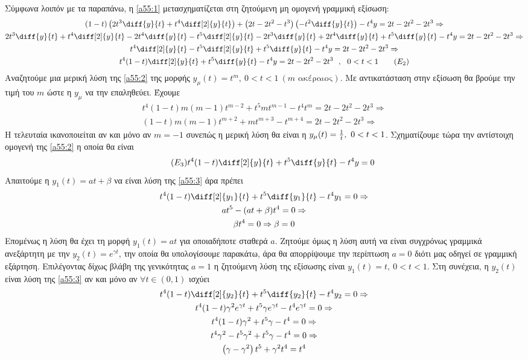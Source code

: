\documentclass[a4paper,twoside,11pt]{book}
\DeclareRobustCommand{\frac}[3][0pt]{%
{\begingroup\hspace{#1}#2\hspace{#1}\endgroup\over\hspace{#1}#3\hspace{#1}}}
\begin{document}
Σύμφωνα λοιπόν με τα παραπάνω, η \eqref{a55:1} μετασχηματίζεται στη ζητούμενη μη ομογενή γραμμική εξίσωση:
\begin{gather}
(1-t)\left( 2t^3\diff{y}{t}+t^4\diff[2]{y}{t}\right)+\left(2t-2t^2-t^3\right)\left( -t^2\diff{y}{t}\right) -t^4y=2t-2t^2-2t^3\Rightarrow\nonumber\\
2t^3\diff{y}{t}+t^4\diff[2]{y}{t}-2t^4\diff{y}{t}-t^5\diff[2]{y}{t}-2t^3\diff{y}{t}+2t^4\diff{y}{t}+t^5\diff{y}{t}-t^4y=2t-2t^2-2t^3\Rightarrow\nonumber\\
t^4\diff[2]{y}{t}-t^5\diff[2]{y}{t}+t^5\diff{y}{t}-t^4y=2t-2t^2-2t^3\Rightarrow\\
t^4(1-t)\diff[2]{y}{t}+t^5\diff{y}{t}-t^4y=2t-2t^2-2t^3\ \ ,\ \ 0<t<1\label{a55:2}\tag{$ E_2 $}
\end{gather}
Αναζητούμε μια μερική λύση της \eqref{a55:2} της μορφής $ y_\mu(t)=t^m,\ 0<t<1\ (m \textrm{ ακέραιος}) $. Με αντικατάσταση στην εξίσωση θα βρούμε την τιμή του $ m $ ώστε η $ y_\mu $ να την επαληθεύει. Έχουμε
\begin{gather*}
t^4(1-t)m(m-1)t^{m-2}+t^5mt^{m-1}-t^4t^m=2t-2t^2-2t^3\Rightarrow\\
(1-t)m(m-1)t^{m+2}+mt^{m+3}-t^{m+4}=2t-2t^2-2t^3\Rightarrow
\end{gather*}
Η τελευταία ικανοποιείται αν και μόνο αν $ m=-1 $ συνεπώς η μερική λύση θα είναι η $ y_\mu(t)=\frac{1}{t},\ 0<t<1 $. Σχηματίζουμε τώρα την αντίστοιχη ομογενή της \eqref{a55:2} η οποία θα είναι
\begin{equation}\label{a55:3}\tag{$ E_3 $}
t^4(1-t)\diff[2]{y}{t}+t^5\diff{y}{t}-t^4y=0
\end{equation}
Απαιτούμε η $ y_1(t)=at+\beta $ να είναι λύση της \eqref{a55:3} άρα πρέπει
\begin{gather*}
t^4(1-t)\diff[2]{y_1}{t}+t^5\diff{y_1}{t}-t^4y_1=0\Rightarrow\\
at^5-(at+\beta)t^4=0\Rightarrow\\
\beta t^4=0\Rightarrow \beta=0
\end{gather*}
Επομένως η λύση θα έχει τη μορφή $ y_1(t)=at $ για οποιαδήποτε σταθερά $ a $. Ζητούμε όμως η λύση αυτή να είναι συγχρόνως γραμμικά ανεξάρτητη με την $ y_2(t)=e^{\gamma t} $, την οποία θα υπολογίσουμε παρακάτω, άρα θα απορρίψουμε την περίπτωση $ a=0 $ διότι μας οδηγεί σε γραμμική εξάρτηση. Επιλέγοντας δίχως βλάβη της γενικότητας $ a=1 $ η ζητούμενη λύση της εξίσωσης είναι $ y_1(t)=t,\ 0<t<1 $. Στη συνέχεια, η $ y_2(t) $ είναι λύση της \eqref{a55:3} αν και μόνο αν $ \forall t\in(0,1) $ ισχύει
\begin{gather*}
t^4(1-t)\diff[2]{y_2}{t}+t^5\diff{y_2}{t}-t^4y_2=0\Rightarrow\\
t^4(1-t)\gamma^2e^{\gamma t}+t^5\gamma e^{\gamma t}-t^4e^{\gamma t}=0\Rightarrow\\
t^4(1-t)\gamma^2+t^5\gamma -t^4=0\Rightarrow\\
t^4\gamma^2-t^5\gamma^2+t^5\gamma -t^4=0\Rightarrow\\
\left( \gamma-\gamma^2\right)t^5+\gamma^2t^4=t^4
\end{gather*}
\end{document}
